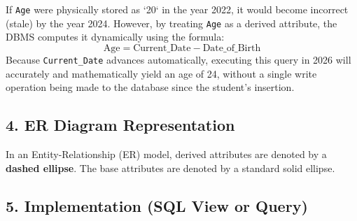 \documentclass[12pt,a3paper]{article}
\begin{document}
\begin{enumerate}
\begin{tcolorbox}[enhanced,breakable,ansbox,colback=cA!4,colframe=cA,boxrule=0.8pt,arc=5pt,title={\textbf{Answer}},fonttitle=\bfseries\color{white},colbacktitle=cA]
If \texttt{Age} were physically stored as `20` in the year 2022, it would become incorrect (stale) by the year 2024. However, by treating \texttt{Age} as a derived attribute, the DBMS computes it dynamically using the formula:
\begin{equation*}
    \text{Age} = \text{Current\_Date} - \text{Date\_of\_Birth}
\end{equation*}
Because \texttt{Current\_Date} advances automatically, executing this query in 2026 will accurately and mathematically yield an age of 24, without a single write operation being made to the database since the student's insertion.

\subsection*{4. ER Diagram Representation}

In an Entity-Relationship (ER) model, derived attributes are denoted by a \textbf{dashed ellipse}. The base attributes are denoted by a standard solid ellipse.

\vspace{1em}
\begin{center}
\end{center}
\vspace{1em}

\subsection*{5. Implementation (SQL View or Query)}


\end{tcolorbox}
\end{enumerate}
\end{document}

